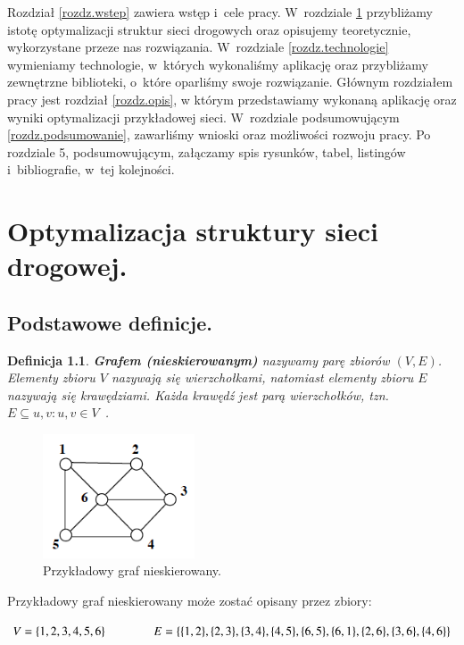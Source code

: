 \documentclass[twoside,12pt]{report}
\let\oldsection\chapter
\def\chapter{\cleardoublepage\oldsection}
\newtheorem{definition}{Definicja} %
\begin{document}
Rozdział \ref{rozdz.wstep} zawiera wstęp i~cele pracy. W~rozdziale \ref{rozdz.optymalizacja} przybliżamy istotę optymalizacji struktur sieci drogowych
oraz opisujemy teoretycznie, wykorzystane przeze nas rozwiązania. W~rozdziale \ref{rozdz.technologie} wymieniamy technologie, w~których wykonaliśmy aplikację oraz przybliżamy zewnętrzne biblioteki, o~które oparliśmy swoje rozwiązanie. Głównym rozdziałem pracy jest rozdział \ref{rozdz.opis},
w którym przedstawiamy wykonaną aplikację oraz wyniki optymalizacji przykładowej sieci. W~rozdziale podsumowującym \ref{rozdz.podsumowanie}, zawarliśmy wnioski oraz możliwości rozwoju pracy. Po rozdziale 5, podsumowującym, załączamy spis rysunków, tabel, listingów i~bibliografie, w~tej kolejności.

\chapter{Optymalizacja struktury sieci drogowej.}\label{rozdz.optymalizacja} 
\section{Podstawowe definicje.}

\begin{definition}\label{Graf nieskierowany}
\textbf{Grafem (nieskierowanym)} nazywamy parę zbiorów $(V,E)$. Elementy zbioru $V$ nazywają się \textit{wierzchołkami}, natomiast elementy zbioru $E$ nazywają się \textit{krawędziami}. Każda krawędź jest parą wierzchołków, tzn. $E \subseteq {{u,v}:u,v \in V}$~\cite{grafy}.
\end{definition}

\begin{figure}[ht]
\begin{center}
\includegraphics[width=0.40\textwidth]{img/graf1}
\caption{Przykładowy graf nieskierowany.} 
\end{center}
\end{figure}

Przykładowy graf nieskierowany może zostać opisany przez zbiory:
\begin{center}
\begin{math}
V=\{1,2,3,4,5,6\} \hspace*{40px} E=\{\{1,2\},\{2,3\},\{3,4\},\{4,5\},\{6,5\},\{6,1\},\{2,6\},\{3,6\},\{4,6\}\}
\end{math}
\end{center}
\end{document}
